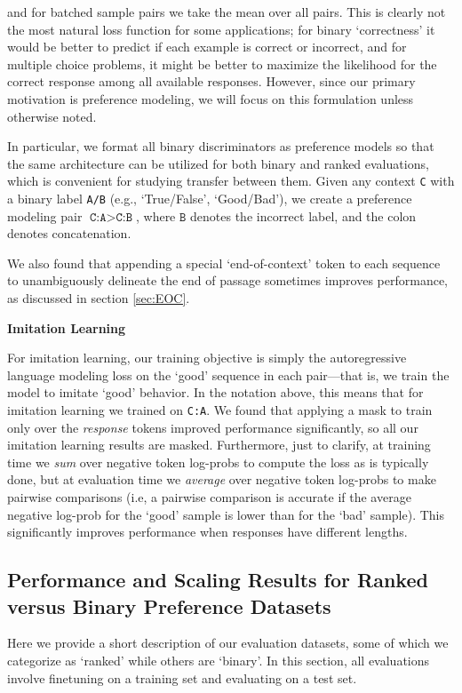 and for batched sample pairs we take the mean over all pairs.  This is clearly not the most natural loss function for some applications; for binary `correctness' it would be better to predict if each example is correct or incorrect, and for multiple choice problems, it might be better to maximize the likelihood for the correct response among all available responses.  However, since our primary motivation is preference modeling, we will focus on this formulation unless otherwise noted.

In particular, we format all binary discriminators as preference models so that the same architecture can be utilized for both binary and ranked evaluations, which is convenient for studying transfer between them. Given any context \texttt{C} with a binary label \texttt{A/B} (e.g., `True/False', `Good/Bad'), we create a preference modeling pair $\texttt{C:A} > \texttt{C:B}$, where $\texttt{B}$ denotes the incorrect label, and the colon denotes concatenation. 

We also found that appending a special `end-of-context' token to each sequence to unambiguously delineate the end of passage sometimes improves performance, as discussed in section \ref{sec:EOC}.

{\bf Imitation Learning}

For imitation learning, our training objective is simply the autoregressive language modeling loss on the `good' sequence in each pair---that is, we train the model to imitate `good' behavior. In the notation above, this means that for imitation learning we trained on \texttt{C:A}. 
We found that applying a mask to train only over the {\it response} tokens improved performance significantly, so all our imitation learning results are masked. Furthermore, just to clarify, at training time we \emph{sum} over negative token log-probs to compute the loss as is typically done, but at evaluation time we \emph{average} over negative token log-probs to make pairwise comparisons (i.e, a pairwise comparison is accurate if the average negative log-prob for the `good' sample is lower than for the `bad' sample).  This significantly improves performance when responses have different lengths.  

\subsection{Performance and Scaling Results for Ranked versus Binary Preference Datasets}
\label{sec:EvalDatasets}

Here we provide a short description of our evaluation datasets, some of which we categorize as `ranked' while others are `binary'.  In this section, all evaluations involve finetuning on a training set and evaluating on a test set.

